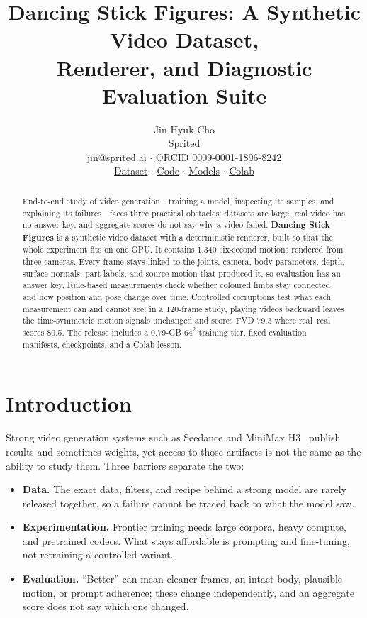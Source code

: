 \documentclass[11pt]{article}
\title{\vspace{-1.5em}\textbf{Dancing Stick Figures: A Synthetic Video Dataset,\\Renderer, and Diagnostic Evaluation Suite}}
\author{Jin Hyuk Cho\\Sprited\\\small\href{mailto:jin@sprited.ai}{jin@sprited.ai} $\cdot$
\href{https://orcid.org/0009-0001-1896-8242}{ORCID 0009-0001-1896-8242}\\[-2pt]
\small\href{https://huggingface.co/datasets/sprited/dancing-stick-figures}{Dataset} $\cdot$
\href{https://github.com/sprited-ai/dancing-stick-figures}{Code} $\cdot$
\href{https://huggingface.co/sprited/dancing-stick-figures-baselines}{Models} $\cdot$
\href{https://colab.research.google.com/github/sprited-ai/dancing-stick-figures/blob/main/notebooks/dancing_stick_figures_colab_v0_3.ipynb}{Colab}}
\date{}
\begin{document}
\doublespacing\linenumbers\raggedbottom\maketitle\vspace{-1.25em}
\begin{abstract}
End-to-end study of video generation---training a model, inspecting its samples, and explaining its
failures---faces three practical obstacles: datasets are large, real video has no answer key,
and aggregate scores do not say why a video failed. \textbf{Dancing Stick Figures} is a synthetic video dataset
with a deterministic renderer, built so that the whole experiment fits on one GPU. It contains 1,340 six-second motions rendered from three cameras. Every frame stays linked to
the joints, camera, body parameters, depth, surface normals, part labels, and source motion that produced it,
so evaluation has an answer key. Rule-based measurements check whether coloured limbs stay connected and how
position and pose change over time. Controlled corruptions test what each measurement can and cannot see: in a
120-frame study, playing videos backward leaves the time-symmetric motion signals unchanged and scores FVD 79.3
where real--real scores 80.5. The release includes a 0.79-GB $64^2$ training tier, fixed evaluation manifests,
checkpoints, and a Colab lesson.
\end{abstract}

\section{Introduction}
Strong video generation systems such as Seedance and MiniMax H3~\cite{gao2025seedance,minimax2026h3} publish
results and sometimes weights, yet access to those artifacts is not the same as the ability to study them.
Three barriers separate the two:
\begin{itemize}[leftmargin=*,nosep]
\item \textbf{Data.} The exact data, filters, and recipe behind a strong model are rarely released together,
so a failure cannot be traced back to what the model saw.
\item \textbf{Experimentation.} Frontier training needs large corpora, heavy compute, and pretrained codecs.
What stays affordable is prompting and fine-tuning, not retraining a controlled variant.
\item \textbf{Evaluation.} ``Better'' can mean cleaner frames, an intact body, plausible motion, or prompt
adherence; these change independently, and an aggregate score does not say which one changed.
\end{itemize}
\end{document}
